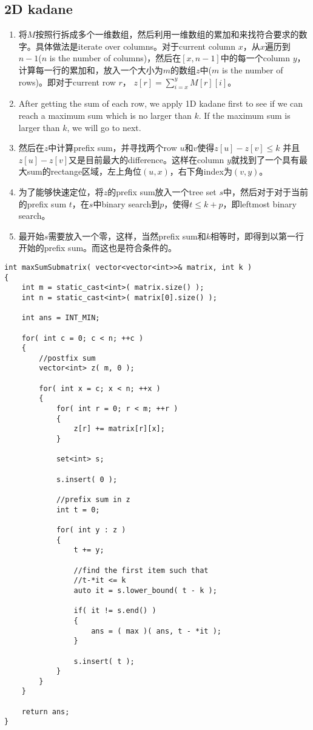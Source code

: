 \subsection{2D kadane}
\begin{enumerate}
\item 将$ M $按照行拆成多个一维数组，然后利用一维数组的累加和来找符合要求的数字。具体做法是iterate over columns。对于current column $ x $，从$x$遍历到$n-1$($ n $ is the number of columns)，然后在$[x,n-1]$中的每一个column $y$，计算每一行的累加和，放入一个大小为$m$的数组$z$中($ m $ is the number of rows)。即对于current row $ r $， $z[r]=\sum\limits_{i=x}^{y}M[r][i]$。
\item After getting the sum of each row, we apply 1D kadane first to see if we can reach a maximum sum which is no larger than $k$. If the maximum sum is larger than $k$, we will go to next.
\item 然后在$z$中计算prefix sum，并寻找两个row $u$和$v$使得$z[u]-z[v]\leq k$ 并且$z[u]-z[v]$又是目前最大的difference。这样在column $y$就找到了一个具有最大sum的rectange区域，左上角位$(u, x)$，右下角index为$(v, y)$。
\item 为了能够快速定位，将$z$的prefix sum放入一个tree set $s$中，然后对于对于当前的prefix sum $t$，在$s$中binary search到$p$，使得$t\leq k+p$，即leftmost binary search。
\item 最开始$s$需要放入一个零，这样，当然prefix sum和$k$相等时，即得到以第一行开始的prefix sum。而这也是符合条件的。
\end{enumerate}

\setcounter{lstlisting}{0}
\begin{lstlisting}[style=customc, caption={2D Kadane}]
int maxSumSubmatrix( vector<vector<int>>& matrix, int k )
{
    int m = static_cast<int>( matrix.size() );
    int n = static_cast<int>( matrix[0].size() );

    int ans = INT_MIN;

    for( int c = 0; c < n; ++c )
    {
        //postfix sum
        vector<int> z( m, 0 );

        for( int x = c; x < n; ++x )
        {
            for( int r = 0; r < m; ++r )
            {
                z[r] += matrix[r][x];
            }

            set<int> s;

            s.insert( 0 );

            //prefix sum in z
            int t = 0;

            for( int y : z )
            {
                t += y;

                //find the first item such that
                //t-*it <= k
                auto it = s.lower_bound( t - k );

                if( it != s.end() )
                {
                    ans = ( max )( ans, t - *it );
                }

                s.insert( t );
            }
        }
    }

    return ans;
}
\end{lstlisting}